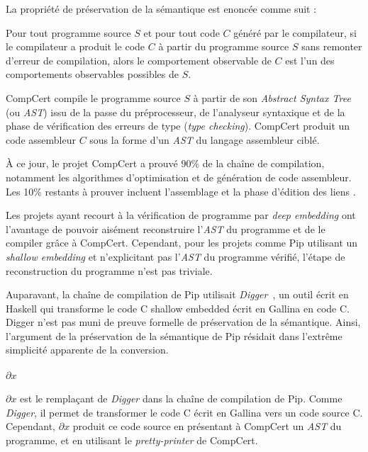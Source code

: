 	La propriété de préservation de la sémantique est enoncée comme suit :

\begin{theorem}	
	Pour tout programme source $S$ et pour tout code $C$ généré par le compilateur, si le compilateur a produit le code $C$ à partir du programme source $S$ sans remonter d'erreur de compilation, alors le comportement observable de $C$ est l'un des comportements observables possibles de $S$.
\end{theorem}

CompCert compile le programme source $S$ à partir de son \emph{Abstract Syntax Tree} (ou \emph{AST}) issu de la passe du préprocesseur, de l'analyseur syntaxique et de la phase de vérification des erreurs de type (\emph{type checking}). CompCert produit un code assembleur $C$ sous la forme d'un \emph{AST} du langage assembleur ciblé.

À ce jour, le projet CompCert a prouvé 90\% de la chaîne de compilation, notamment les algorithmes d'optimisation et de génération de code assembleur. Les 10\% restants à prouver incluent l'assemblage et la phase d'édition des liens \cite{compcert_online}.

Les projets ayant recourt à la vérification de programme par \emph{deep embedding} ont l'avantage de pouvoir aisément reconstruire l'\emph{AST} du programme et de le compiler grâce à CompCert. Cependant, pour les projets comme Pip utilisant un \emph{shallow embedding} et n'explicitant pas l'\emph{AST} du programme vérifié, l'étape de reconstruction du programme n'est pas triviale.

Auparavant, la chaîne de compilation de Pip utilisait \emph{Digger}~\cite{digger}, un outil écrit en Haskell qui transforme le code C shallow embedded écrit en Gallina en code C. Digger n'est pas muni de preuve formelle de préservation de la sémantique. Ainsi, l'argument de la préservation de la sémantique de Pip résidait dans l'extrême simplicité apparente de la conversion.

		\paragraph{$\partial x$} $\partial x$ est le remplaçant de \emph{Digger} dans la chaîne de compilation de Pip. Comme \emph{Digger}, il permet de transformer le code C écrit en Gallina vers un code source C. Cependant, $\partial x$ produit ce code source en présentant à CompCert un \emph{AST} du programme, et en utilisant le \emph{pretty-printer} de CompCert.

